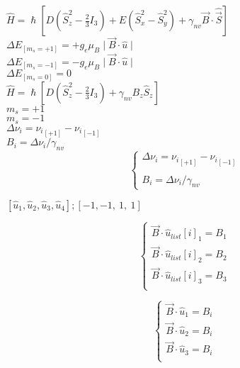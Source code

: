 \documentclass{report}
\begin{document}
     $\hat{H} = \hslash [ D (\hat{S}_z^2 - \frac{2}{3} I_3) + E (\hat{S}_x^2 - \hat{S}_y^2) + \gamma_{nv} \vec{B} \cdot \hat{\vec{S}} ]$\\
     $\Delta E_{[m_s = +1]} = + g_e \mu_B \mid \vec{B} \cdot \hat{u} \mid$ \\
     $\Delta E_{[m_s = -1]} = - g_e \mu_B \mid\vec{B} \cdot \hat{u} \mid$ \\
     $\Delta E_{[m_s = 0]} = 0$ \\
     $\hat{H} = \hslash [ D (\hat{S}_z^2 - \frac{2}{3} I_3) + \gamma_{nv} B_z \hat{S}_z ]$\\
     $m_s = +1$ \\
     $m_s = -1$ \\
     $\Delta \nu_i = {\nu_i}_{[+1]} - {\nu_i}_{[-1]} $ \\
     $B_i = \Delta \nu_i / \gamma_{nv} $ \\
     \begin{equation}
      \begin{cases}
        \Delta \nu_i = {\nu_i}_{[+1]} - {\nu_i}_{[-1]} \\ \\
        B_i = \Delta \nu_i / \gamma_{nv} 
      \end{cases}  
     \end{equation}
      
    $[\hat{u}_1,\hat{u}_2,\hat{u}_3,\hat{u}_4];[-1,-1, \ 1, \ 1]$

     \begin{equation}
      \begin{cases}
        \vec{B} \cdot \hat{u}_{list}[i]_1 = B_1 \\
        \vec{B} \cdot \hat{u}_{list}[i]_2 = B_2 \\
        \vec{B} \cdot \hat{u}_{list}[i]_3 = B_3 \\
      \end{cases}  
     \end{equation}

     \begin{equation}
      \begin{cases}
        \vec{B} \cdot \hat{u}_1 = B_i \\
        \vec{B} \cdot \hat{u}_2 = B_i \\
        \vec{B} \cdot \hat{u}_3 = B_i \\
      \end{cases}  
     \end{equation}
\end{document}

